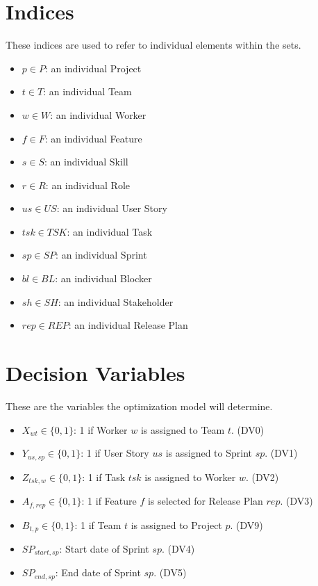 \documentclass[11pt]{article}
\begin{document}
\section{Indices}
These indices are used to refer to individual elements within the sets.
\begin{itemize}
    \item $p \in P$: an individual Project
    \item $t \in T$: an individual Team
    \item $w \in W$: an individual Worker
    \item $f \in F$: an individual Feature
    \item $s \in S$: an individual Skill
    \item $r \in R$: an individual Role
    \item $us \in US$: an individual User Story
    \item $tsk \in TSK$: an individual Task
    \item $sp \in SP$: an individual Sprint
    \item $bl \in BL$: an individual Blocker
    \item $sh \in SH$: an individual Stakeholder
    \item $rep \in REP$: an individual Release Plan
\end{itemize}

\section{Decision Variables}
These are the variables the optimization model will determine.
\begin{itemize}
    \item $X_{wt} \in \{0, 1\}$: 1 if Worker $w$ is assigned to Team $t$. (DV0)
    \item $Y_{us,sp} \in \{0, 1\}$: 1 if User Story $us$ is assigned to Sprint $sp$. (DV1)
    \item $Z_{tsk,w} \in \{0, 1\}$: 1 if Task $tsk$ is assigned to Worker $w$. (DV2)
    \item $A_{f,rep} \in \{0, 1\}$: 1 if Feature $f$ is selected for Release Plan $rep$. (DV3)
    \item $B_{t,p} \in \{0, 1\}$: 1 if Team $t$ is assigned to Project $p$. (DV9)
    \item $SP_{start,sp}$: Start date of Sprint $sp$. (DV4)
    \item $SP_{end,sp}$: End date of Sprint $sp$. (DV5)
\end{itemize}
\end{document}
